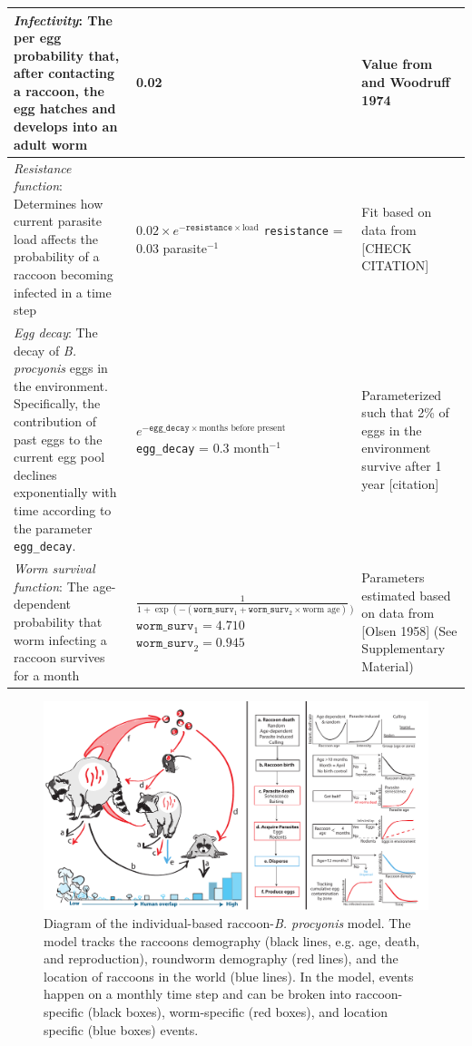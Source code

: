 \documentclass[11pt]{article}
\begin{document}
\begin{longtable}{p{4.5cm} p{4.5cm} p{5cm}}
\hline
\emph{Infectivity}: The per egg probability that, after contacting a raccoon, the egg hatches and develops into an adult worm & 0.02 & Value from \cite{Croll1982} and Woodruff 1974  \\ 
\hline
\emph{Resistance function}: Determines how current parasite load affects the probability of a raccoon becoming infected in a time step &  $0.02 \times e^{-\texttt{resistance} \times \text{load}}$ \newline\newline \texttt{resistance} = 0.03 parasite$^{-1}$ & Fit based on data from \cite{Croll1982} [CHECK CITATION] \\
\hline
\emph{Egg decay}: The decay of \emph{B. procyonis} eggs in the environment. Specifically, the contribution of past eggs to the current egg pool declines exponentially with time according to the parameter \texttt{egg\_decay}. &  $e^{-\texttt{egg\_decay} \times \text{months before present}}$ \newline\newline \texttt{egg\_decay} = 0.3 month$^{-1}$ & Parameterized such that 2\% of eggs in the environment survive after 1 year [citation] \\
\hline
\emph{Worm survival function}: The age-dependent probability that worm infecting a raccoon survives for a month & $\frac{1}{1 + \exp(-(\texttt{worm\_surv}_1 + \texttt{worm\_surv}_2\times \text{worm age}))}$ \newline\newline $\texttt{worm\_surv}_1 = 4.710$ \newline $\texttt{worm\_surv}_2 = 0.945$  & Parameters estimated based on data from [Olsen 1958] (See Supplementary Material)  \\
\bottomrule
\end{longtable}

\clearpage

\begin{figure}
    \includegraphics[width=\textwidth]{images/lifecycle_model_diagram.pdf}
    \caption{Diagram of the individual-based raccoon-\emph{B. procyonis} model.  The model tracks the raccoons demography (black lines, e.g. age, death, and reproduction), roundworm demography (red lines), and the location of raccoons in the world (blue lines).  In the model, events happen on a monthly time step and can be broken into raccoon-specific (black boxes), worm-specific (red boxes), and location specific (blue boxes) events.}
    \label{fig:mod_diagram}
\end{figure}
\end{document}
